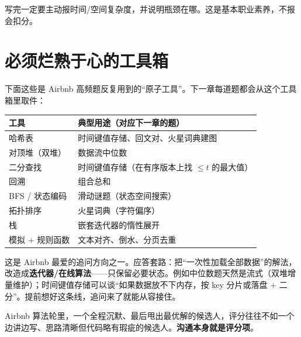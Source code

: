 \begin{keypoint}[复杂度报价]
写完一定要主动报时间/空间复杂度，并说明瓶颈在哪。这是基本职业素养，不报会扣分。
\end{keypoint}

\section{必须烂熟于心的工具箱}

下面这些是 Airbnb 高频题反复用到的“原子工具”。下一章每道题都会从这个工具箱里取件：

\begin{center}
\begin{tabularx}{\linewidth}{@{}l X@{}}
\toprule
\textbf{工具} & \textbf{典型用途（对应下一章的题）} \\
\midrule
哈希表 & 时间键值存储、回文对、火星词典建图 \\
对顶堆（双堆） & 数据流中位数 \\
二分查找 & 时间键值存储（在有序版本上找 $\le t$ 的最大值） \\
回溯 & 组合总和 \\
BFS / 状态编码 & 滑动谜题（状态空间搜索） \\
拓扑排序 & 火星词典（字符偏序） \\
栈 & 嵌套迭代器的惰性展开 \\
模拟 + 规则函数 & 文本对齐、倒水、分页去重 \\
\bottomrule
\end{tabularx}
\end{center}

\begin{followup}
这是 Airbnb 最爱的追问方向之一。应答套路：把“一次性加载全部数据”的解法，改造成\textbf{迭代器/在线算法}——只保留必要状态。例如中位数题天然是流式（双堆增量维护）；时间键值存储可以谈“如果数据放不下内存，按 key 分片或落盘 + 二分”。提前想好这条线，追问来了就能从容接住。
\end{followup}

\begin{pitfall}
Airbnb 算法轮里，一个全程沉默、最后甩出最优解的候选人，评分往往不如一个边讲边写、思路清晰但代码略有瑕疵的候选人。\textbf{沟通本身就是评分项}。
\end{pitfall}
